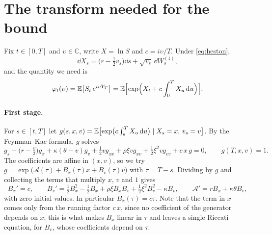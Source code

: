 \section{The transform needed for the bound}\label{app:transform}

Fix $t\in[0,T]$ and $\upsilon\in\mathbb C$, write $X=\ln S$ and $c=i\upsilon/T$. Under
\eqref{eq:heston},
\begin{equation*}
\dd X_s = \bigl(r - \tfrac12v_s\bigr)\dd s + \sqrt{v_s}\,\dd W^{(1)}_s,
\end{equation*}
and the quantity we need is
\begin{equation*}
\varphi_t(\upsilon) = \mathbb{E}\bigl[S_t\,e^{i\upsilon Y_T}\bigr]
= \mathbb{E}\Bigl[\exp\Bigl(X_t + c\int_0^T X_u\,\mathrm{d} u\Bigr)\Bigr].
\end{equation*}

\paragraph{First stage.} For $s\in[t,T]$ let
$g(s,x,v) = \mathbb{E}\bigl[\exp\bigl(c\int_s^TX_u\,\mathrm{d} u\bigr)\mid X_s=x,\,v_s=v\bigr]$. By the Feynman--Kac
formula, $g$ solves
\begin{equation*}
g_s + \bigl(r-\tfrac v2\bigr)g_x + \kappa(\theta-v)g_v + \tfrac12vg_{xx} + \rho\xi vg_{xv} + \tfrac12\xi^2vg_{vv}
+ c\,x\,g = 0,\qquad g(T,x,v)=1 .
\end{equation*}
The coefficients are affine in $(x,v)$, so we try $g=\exp\bigl(\mathcal A(\tau) + B_x(\tau)x + B_v(\tau)v\bigr)$
with $\tau = T-s$. Dividing by $g$ and collecting the terms that multiply $x$, $v$ and $1$ gives
\begin{equation}\label{eq:appsys}
B_x' = c,\qquad
B_v' = \tfrac12B_x^2 - \tfrac12B_x + \rho\xi B_xB_v + \tfrac12\xi^2B_v^2 - \kappa B_v,\qquad
\mathcal A' = rB_x + \kappa\theta B_v,
\end{equation}
with zero initial values. In particular $B_x(\tau) = c\tau$. Note that the term in $x$ comes only from the
running factor $c\,x$, since no coefficient of the generator depends on $x$; this is what makes $B_x$
linear in $\tau$ and leaves a single Riccati equation, for $B_v$, whose coefficients depend on $\tau$.

